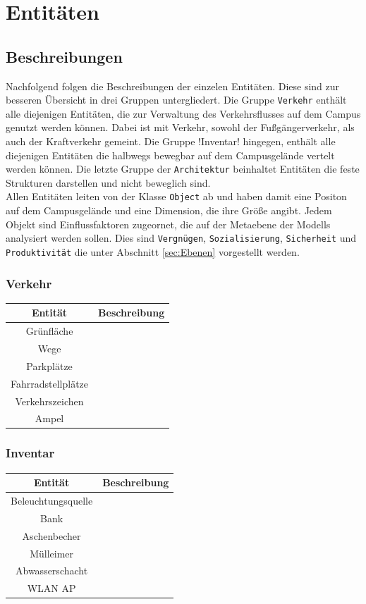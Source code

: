 \documentclass[10pt]{scrartcl}
\begin{document}
\section{Entitäten}

	\subsection{Beschreibungen}
	Nachfolgend folgen die Beschreibungen der einzelen Entitäten. Diese sind zur besseren Übersicht in drei Gruppen untergliedert. Die Gruppe \verb!Verkehr! enthält alle diejenigen Entitäten, die zur Verwaltung des Verkehrsflusses auf dem Campus genutzt werden können. Dabei ist mit Verkehr, sowohl der Fußgängerverkehr, als auch der Kraftverkehr gemeint.
	Die Gruppe \ver!Inventar! hingegen, enthält alle diejenigen Entitäten die halbwegs bewegbar auf dem Campusgelände vertelt werden können. Die letzte Gruppe der \verb!Architektur! beinhaltet Entitäten die feste Strukturen darstellen und nicht beweglich sind.\\
	Allen Entitäten leiten von der Klasse \verb!Object! ab und haben damit eine Positon auf dem Campusgelände und eine Dimension, die ihre Größe angibt. Jedem Objekt sind Einflussfaktoren zugeornet, die auf der Metaebene der Modells analysiert werden sollen. Dies sind \verb!Vergnügen!,
	\verb!Sozialisierung!, \verb!Sicherheit! und \verb!Produktivität! die unter Abschnitt \ref{sec:Ebenen} vorgestellt werden.
	
	\subsubsection{Verkehr}
	\begin{tabular}{|c|c|}
\hline Entität & Beschreibung \\ 
\hline
\hline Grünfläche &  \\ 
\hline Wege &  \\ 
\hline Parkplätze &  \\ 
\hline Fahrradstellplätze &  \\ 
\hline Verkehrszeichen &  \\ 
\hline Ampel &  \\ 
\hline 
\end{tabular} 

	\subsubsection{Inventar}
\begin{tabular}{|c|c|}
\hline Entität & Beschreibung \\
\hline
\hline Beleuchtungsquelle &  \\ 
\hline Bank &  \\ 
\hline Aschenbecher &  \\ 
\hline Mülleimer &  \\ 
\hline Abwasserschacht &  \\ 
\hline WLAN AP &  \\ 
\hline 
\end{tabular}
\end{document}
